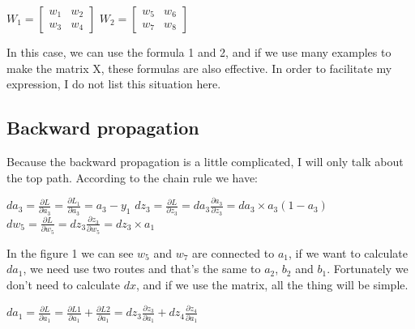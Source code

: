 \documentclass[10pt]{article}
\begin{document}
\begin{flushleft}
        \begin{center}
        $W_1 = \begin{bmatrix}
            w_1  & w_2\\
            w_3  & w_4
        \end{bmatrix}$ \quad
        $W_2 = \begin{bmatrix}
            w_5 & w_6\\
            w_7 & w_8
        \end{bmatrix}$ \vspace{3ex}
        \end{center}
        In this case, we can use the formula 1 and 2, and if we use many examples to make the matrix X, these formulas are also effective. In order to facilitate my expression, I do not list this situation here.
     \end{flushleft} 

    \subsection*{Backward propagation}
    \begin{flushleft}
        Because the backward propagation is a little complicated, I will only talk about the top path. According to the chain rule we have:\vspace{3ex}

        $da_3 = \frac{\partial L}{\partial a_3} = \frac{\partial L_1}{\partial a_3} = a_3 - y_1$ \qquad    
        $dz_3 = \frac{\partial L}{\partial z_3} = da_3\frac{\partial a_3}{\partial z_3} = da_3\times a_3(1-a_3)$ \qquad 
        $dw_5 = \frac{\partial L}{\partial w_5} = dz_3\frac{\partial z_3}{\partial w_5} = dz_3\times a_1$ \vspace{2ex}

        In the figure 1 we can see $w_5$ and $w_7$ are connected to $a_1$, if we want to calculate $da_1$, we need use two routes and that's the same to $a_2$, $b_2$ and $b_1$. Fortunately we don't need to calculate $dx$, and if we use the matrix, all the thing will be simple.\vspace{3ex}
        
        $da_1= \frac{\partial L}{\partial a_1} = \frac{\partial L1}{\partial a_1} + \frac{\partial L2}{\partial a_1} = dz_3\frac{\partial z_3}{\partial a_1} + dz_4\frac{\partial z_4}{\partial a_1}$
    \end{flushleft}
 
\end{document}
